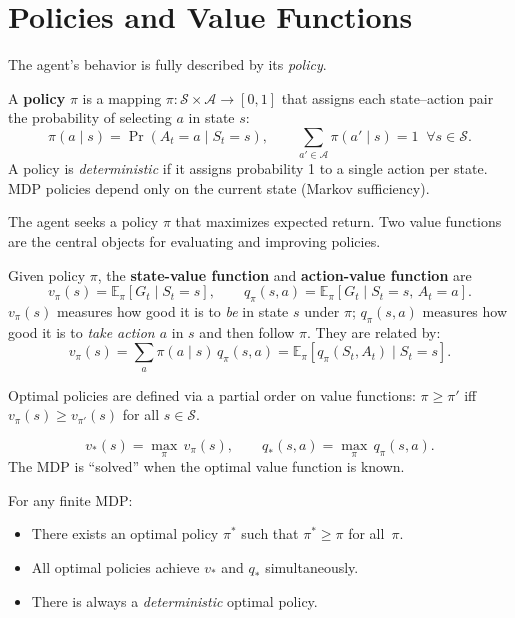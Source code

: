 \documentclass[11pt, oneside]{book}
\newcommand{\E}{\mathbb{E}}              %
\newcommand{\Sset}{\mathcal{S}}          %
\newcommand{\Aset}{\mathcal{A}}          %
\newcommand{\vpi}{v_{\pi}}               %
\newcommand{\qpi}{q_{\pi}}               %
\newcommand{\vstar}{v_{*}}               %
\newcommand{\qstar}{q_{*}}               %
\begin{document}
\section{Policies and Value Functions}

The agent's behavior is fully described by its \emph{policy}.

\begin{defbox}[title={Policy}]
A \textbf{policy} $\pi$ is a mapping $\pi : \Sset \times \Aset \to [0,1]$ that assigns
each state--action pair the probability of selecting $a$ in state $s$:
\[
  \pi(a \mid s) = \Pr(A_t = a \mid S_t = s),
  \qquad \sum_{a' \in \Aset} \pi(a' \mid s) = 1 \;\;\forall s \in \Sset.
\]
A policy is \emph{deterministic} if it assigns probability 1 to a single action per
state. MDP policies depend only on the current state (Markov sufficiency).
\end{defbox}

The agent seeks a policy $\pi$ that maximizes expected return.
Two value functions are the central objects for evaluating and improving policies.

\begin{defbox}[title={State-Value and Action-Value Functions}]
Given policy $\pi$, the \textbf{state-value function} and
\textbf{action-value function} are
\[
  \vpi(s) = \E_{\pi}[G_t \mid S_t=s],
  \qquad
  \qpi(s,a) = \E_{\pi}[G_t \mid S_t=s,\, A_t=a].
\]
$\vpi(s)$ measures how good it is to \emph{be} in state $s$ under $\pi$;
$\qpi(s,a)$ measures how good it is to \emph{take action $a$} in $s$ and then
follow $\pi$. They are related by:
\[
  \vpi(s) = \sum_{a} \pi(a \mid s)\, \qpi(s,a)
           = \E_{\pi}[q_\pi(S_t,A_t) \mid S_t=s].
\]
\end{defbox}

Optimal policies are defined via a partial order on value functions: $\pi \ge \pi'$
iff $\vpi(s) \ge v_{\pi'}(s)$ for all $s \in \Sset$.

\begin{defbox}[title={Optimal Value Functions}]
\[
  \vstar(s) = \max_{\pi}\, \vpi(s),
  \qquad
  \qstar(s,a) = \max_{\pi}\, \qpi(s,a).
\]
The MDP is ``solved'' when the optimal value function is known.
\end{defbox}

\begin{thmbox}[title={Optimal Policies}]
For any finite MDP:
\begin{itemize}
  \item There exists an optimal policy $\pi^*$ such that $\pi^* \ge \pi$ for
    all~$\pi$.
  \item All optimal policies achieve $\vstar$ and $\qstar$ simultaneously.
  \item There is always a \emph{deterministic} optimal policy.
\end{itemize}
\end{thmbox}
\end{document}
